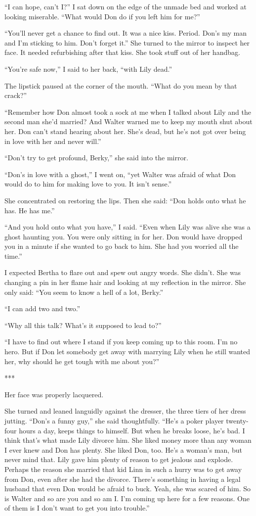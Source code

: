 \documentclass{novel}
\begin{document}
“I can hope, can’t I?” I sat down on the edge of the unmade bed and worked at looking miserable. “What would Don do if you left him for me?”

“You’ll never get a chance to find out. It was a nice kiss. Period. Don’s my man and I’m sticking to him. Don’t forget it.” She turned to the mirror to inspect her face. It needed refurbishing after that kiss. She took stuff out of her handbag.

“You’re safe now,” I said to her back, “with Lily dead.”

The lipstick paused at the corner of the mouth. “What do you mean by that crack?”

“Remember how Don almost took a sock at me when I talked about Lily and the second man she’d married? And Walter warned me to keep my mouth shut about her. Don can’t stand hearing about her. She’s dead, but he’s not got over being in love with her and never will.”

“Don’t try to get profound, Berky,” she said into the mirror.

“Don’s in love with a ghost,” I went on, “yet Walter was afraid of what Don would do to him for making love to you. It isn’t sense.”

She concentrated on restoring the lips. Then she said: “Don holds onto what he has. He has me.”

“And you hold onto what you have,” I said. “Even when Lily was alive she was a ghost haunting you. You were only sitting in for her. Don would have dropped you in a minute if she wanted to go back to him. She had you worried all the time.”

I expected Bertha to flare out and spew out angry words. She didn’t. She was changing a pin in her flame hair and looking at my reflection in the mirror. She only said: “You seem to know a hell of a lot, Berky.”

“I can add two and two.”

“Why all this talk? What’s it supposed to lead to?”

“I have to find out where I stand if you keep coming up to this room. I’m no hero. But if Don let somebody get away with marrying Lily when he still wanted her, why should he get tough with me about you?”

***

Her face was properly lacquered.

She turned and leaned languidly against the dresser, the three tiers of her dress jutting. “Don’s a funny guy,” she said thoughtfully. “He’s a poker player twenty-four hours a day, keeps things to himself. But when he breaks loose, he’s bad. I think that’s what made Lily divorce him. She liked money more than any woman I ever knew and Don has plenty. She liked Don, too. He’s a woman’s man, but never mind that. Lily gave him plenty of reason to get jealous and explode. Perhaps the reason she married that kid Linn in such a hurry was to get away from Don, even after she had the divorce. There’s something in having a legal husband that even Don would be afraid to buck. Yeah, she was scared of him. So is Walter and so are you and so am I. I’m coming up here for a few reasons. One of them is I don’t want to get you into trouble.”
\end{document}
